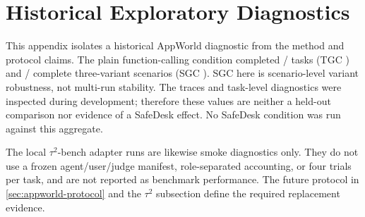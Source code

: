 \section{Historical Exploratory Diagnostics}
\label{app:historical-diagnostics}

This appendix isolates a historical AppWorld  diagnostic
from the method and protocol claims. The plain function-calling condition completed
\AWBaseSuccessCount/\AWTaskCount{} tasks (TGC \AWBaseTGC) and
\AWBaseScenarioSuccessCount/\AWScenarioCount{} complete three-variant scenarios
(SGC \AWBaseSGC). SGC here is scenario-level variant robustness, not multi-run
stability. The traces and task-level diagnostics were inspected during development;
therefore these values are neither a held-out comparison nor evidence of a SafeDesk
effect. No SafeDesk condition was run against this aggregate.

The local $\tau^2$-bench adapter runs are likewise smoke diagnostics only. They do
not use a frozen agent/user/judge manifest, role-separated accounting, or four
trials per task, and are not reported as benchmark performance. The future protocol
in \cref{sec:appworld-protocol} and the $\tau^2$ subsection define the required
replacement evidence.
